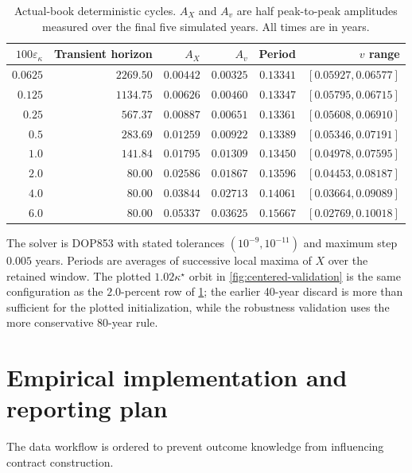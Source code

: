\documentclass[11pt]{article}
\begin{document}
\begin{table}[!htbp]
\centering
\begin{tabular}{rrrrrr}
\toprule
$100\varepsilon_\kappa$ & Transient horizon & $A_X$ & $A_v$ & Period & $v$ range\\
\midrule
$0.0625$ & $2269.50$ & $0.00442$ & $0.00325$ & $0.13341$ & $[0.05927,0.06577]$\\
$0.125$ & $1134.75$ & $0.00626$ & $0.00460$ & $0.13347$ & $[0.05795,0.06715]$\\
$0.25$ & $567.37$ & $0.00887$ & $0.00651$ & $0.13361$ & $[0.05608,0.06910]$\\
$0.5$ & $283.69$ & $0.01259$ & $0.00922$ & $0.13389$ & $[0.05346,0.07191]$\\
$1.0$ & $141.84$ & $0.01795$ & $0.01309$ & $0.13450$ & $[0.04978,0.07595]$\\
$2.0$ & $80.00$ & $0.02586$ & $0.01867$ & $0.13596$ & $[0.04453,0.08187]$\\
$4.0$ & $80.00$ & $0.03844$ & $0.02713$ & $0.14061$ & $[0.03664,0.09089]$\\
$6.0$ & $80.00$ & $0.05337$ & $0.03625$ & $0.15667$ & $[0.02769,0.10018]$\\
\bottomrule
\end{tabular}
\caption{Actual-book deterministic cycles.  $A_X$ and $A_v$ are half peak-to-peak
amplitudes measured over the final five simulated years.  All times are in years.}
\label{tab:cycle-convergence}
\end{table}

The solver is DOP853 with stated tolerances $(10^{-9},10^{-11})$ and maximum step
$0.005$ years.  Periods are averages of successive local maxima of $X$ over the retained
window.  The plotted $1.02\kappa^\star$ orbit in \cref{fig:centered-validation} is the same
configuration as the $2.0$-percent row of \cref{tab:cycle-convergence}; the earlier 40-year
discard is more than sufficient for the plotted initialization, while the robustness validation
uses the more conservative 80-year rule.

\FloatBarrier
\section{Empirical implementation and reporting plan}
\label{app:empirical-audit}

The data workflow is ordered to prevent outcome knowledge from influencing contract
construction.
\end{document}
